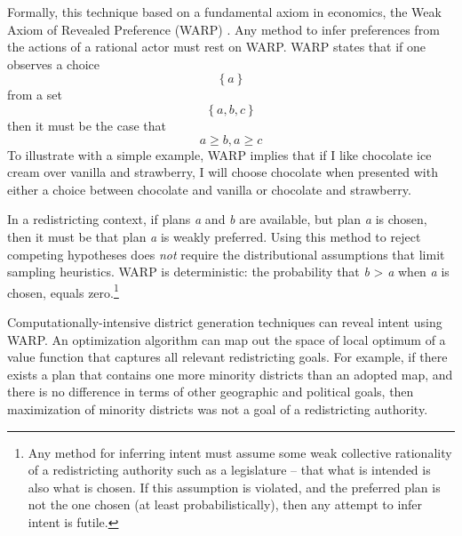 \documentclass[article]{JSSstyle/jss}
\begin{document}
Formally, this technique based on a fundamental axiom in economics, the Weak Axiom
of Revealed Preference (WARP) \citep[][]{Samuelson48}. Any method to infer preferences
from the actions of a rational actor must rest on WARP.  WARP states
that if one observes a choice 
\[
\left\{ a \right\}
\]
 from a set 
\[
\left\{ {a,b,c} \right\}
\]
  then it must be the case that
\[
a \ge b,a \ge c
\]
To illustrate with a simple example, WARP implies that if I like
chocolate ice cream over vanilla and strawberry, I will choose
chocolate when presented with either a choice between chocolate and
vanilla or chocolate and strawberry. 

In a redistricting context, if plans \textit{a} and \textit{b} are available, but 
plan \textit{a} is
chosen, then it must be that plan \textit{a} is weakly preferred.  Using this 
method to reject competing hypotheses does \textit{not}
require the distributional assumptions that limit sampling heuristics.  WARP is 
deterministic: the probability that \textit{b }{\textgreater}
\textit{a} when \textit{a} is chosen, equals zero.\footnote{Any
method for inferring intent must assume some weak collective
rationality of a redistricting authority such as a legislature -- that what is intended is also what is chosen. If this
assumption is violated, and the preferred plan is not the one chosen
(at least probabilistically), then any attempt to infer intent is
futile.}

Computationally-intensive district generation techniques 
can reveal intent using WARP.  An optimization algorithm can  
map out the space of local optimum of a value function that captures all relevant 
redistricting goals.  For example, if there exists a plan that contains one more 
minority districts than an adopted map, and there is no difference in terms of other
geographic and political goals, then maximization of minority districts was not a 
goal of a redistricting authority.
\end{document}
